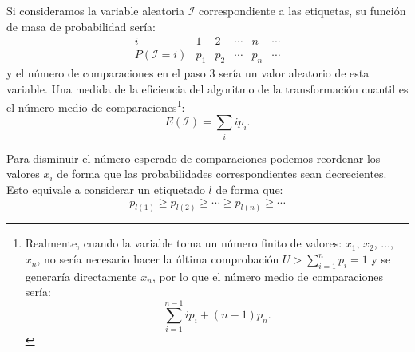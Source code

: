 \documentclass[
  10pt,
]{book}
\theoremstyle{break}
\theoremstyle{nonumberplain}
\let\oldfootnote\footnote
\renewcommand\footnote[1]{\oldfootnote{\hspace{2mm}#1}}
\begin{document}
Si consideramos la variable aleatoria \(\mathcal{I}\) correspondiente a las etiquetas, su función de masa de probabilidad sería:
\[\begin{array}{l|ccccc}
i & 1 & 2 & \cdots & n & \cdots \\ \hline
P\left( \mathcal{I}=i\right) & p_{1} & p_{2} & \cdots & p_{n} & \cdots 
\end{array}\]
y el número de comparaciones en el paso 3 sería un valor aleatorio de esta variable.
Una medida de la eficiencia del algoritmo de la transformación cuantil es el número medio de comparaciones\footnote{Realmente, cuando la variable toma un número finito de valores: \(x_{1}\), \(x_{2}\), \(\ldots\), \(x_{n}\), no sería necesario hacer
  la última comprobación \(U>\sum_{i=1}^{n}p_{i}=1\) y se generaría directamente \(x_{n}\), por lo que el número medio de comparaciones sería: \[\sum_{i=1}^{n-1}ip_{i}+\left( n-1\right)  p_{n}.\]}:
\[E\left( \mathcal{I}\right) =\sum_i ip_{i}.\]

Para disminuir el número esperado de comparaciones podemos
reordenar los valores \(x_{i}\) de forma que las probabilidades
correspondientes sean decrecientes. Esto equivale a considerar
un etiquetado \(l\) de forma que:
\[p_{l\left( 1\right) }\geq p_{l\left( 2\right) }\geq \cdots \geq p_{l\left(
n\right) }\geq \cdots\]
\end{document}

